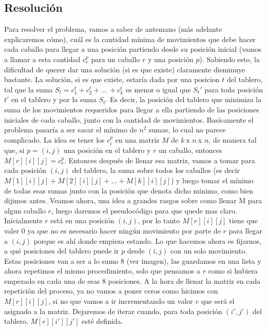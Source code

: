 \documentclass[a4paper]{article}
\begin{document}
\subsection{Resolución}
Para resolver el problema, vamos a saber de antemano (más adelante explicaremos cómo), cuál es la cantidad mínima de movimientos que debe hacer cada caballo para llegar a una posición partiendo desde su posición inicial (vamos a llamar a esta cantidad $c_{r}^{p}$ para un caballo $r$ y una posición $p$). Sabiendo esto, la dificultad de querer dar una solución (si es que existe) claramente disminuye bastante. La solución, si es que existe, estaría dada por una posicion $t$ del tablero, tal que la suma $S_t = c_{1}^{t} + c_{2}^{t} + ... \ + c_{k}^{t}$ es menor o igual que $S_t'$ para toda posición $t'$ en el tablero y por la suma $S_t$. Es decir, la posición del tablero que minimiza la suma de los movimientos requeridos para llegar a ella partiendo de las posiciones iniciales de cada caballo, junto con la cantidad de movimientos. Basícamente el problema pasaría a ser sacar el mínimo de $n^2$ sumas, lo cual no parece complicado.
\newline La idea es tener los $c_{i}^{p}$ en una matriz $M$ de $k \ $x $ n \ $x $ n$, de manera tal que, si $p = (i, j)$ una posición en el tablero y $r$ un caballo, entonces $M[r][i][j] = c_{r}^{p}$. Entonces después de llenar esa matriz, vamos a tomar para cada posición $(i, j)$ del tablero, la suma sobre todos los caballos (es decir $M[1][i][j] + M[2][i][j] + ... + M[k][i][j]$) y luego tomar el mínimo de todas esas sumas junto con la posición que denota dicho mínimo, como bien dijimos antes.
\newline
\newline Veamos ahora, una idea a grandes rasgos sobre como llenar M para algun caballo $r$, luego daremos el pseudocódigo para que quede mas claro.
\newline Inicialmente $r$ está en una posición $(i, j)$, por lo tanto $M[r][i][j]$ tiene que valer 0 ya que no es necesario hacer ningún movimiento por parte de $r$ para llegar a $(i, j)$ porque es ahí donde empieza estando. Lo que hacemos ahora es fijarnos, a qué posiciones del tablero puede ir $p$ desde $(i, j)$ con un solo movimiento. Estas posiciones van a ser a lo sumo 8 (ver imagen), las guardamos en una lista y ahora repetimos el mismo procedimiento, solo que pensamos a $r$ como si hubiera empezado en cada una de esas 8 posiciones. A la hora de llenar la matriz en cada repetición del proceso, ya no vamos a poner ceros como hicimos con $M[r][i][j]$, si no que vamos a ir incrementando un valor $v$ que será el asignado a la matriz. Dejaremos de iterar cuando, para toda posición $(i', j')$ del tablero, $M[r][i'][j']$ esté definida.
\end{document}
